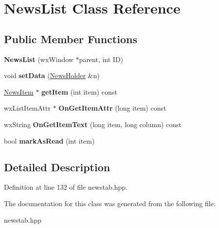 \hypertarget{class_news_list}{\section{News\-List Class Reference}
\label{class_news_list}
}
\subsection*{Public Member Functions}
\begin{DoxyCompactItemize}
\item 
\hypertarget{class_news_list_a8dd5d835b29b97afadb83e768e82eb84}{{\bfseries News\-List} (wx\-Window $\ast$parent, int I\-D)}\label{class_news_list_a8dd5d835b29b97afadb83e768e82eb84}

\item 
\hypertarget{class_news_list_a15ef3e8f9ef33b360989190f70bb54a8}{void {\bfseries set\-Data} (\hyperlink{struct_news_holder}{News\-Holder} \&n)}\label{class_news_list_a15ef3e8f9ef33b360989190f70bb54a8}

\item 
\hypertarget{class_news_list_a6718379f53da5081e30f57e26bae1817}{\hyperlink{struct_news_item}{News\-Item} $\ast$ {\bfseries get\-Item} (int item) const }\label{class_news_list_a6718379f53da5081e30f57e26bae1817}

\item 
\hypertarget{class_news_list_a426242320c93c5920d4e141c1555e1f3}{wx\-List\-Item\-Attr $\ast$ {\bfseries On\-Get\-Item\-Attr} (long item) const }\label{class_news_list_a426242320c93c5920d4e141c1555e1f3}

\item 
\hypertarget{class_news_list_a7f469ead3d8693a35944c395cce9c6f6}{wx\-String {\bfseries On\-Get\-Item\-Text} (long item, long column) const }\label{class_news_list_a7f469ead3d8693a35944c395cce9c6f6}

\item 
\hypertarget{class_news_list_a584e20f0de7d0970469d2a0013e3dd6b}{bool {\bfseries mark\-As\-Read} (int item)}\label{class_news_list_a584e20f0de7d0970469d2a0013e3dd6b}

\end{DoxyCompactItemize}


\subsection{Detailed Description}


Definition at line 132 of file newstab.\-hpp.



The documentation for this class was generated from the following file\-:\begin{DoxyCompactItemize}
\item 
newstab.\-hpp\end{DoxyCompactItemize}
